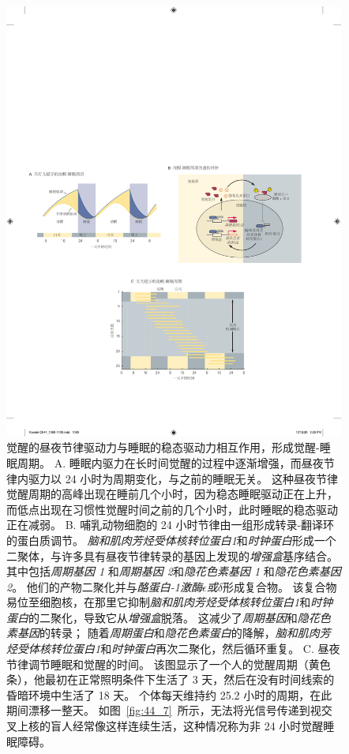 \begin{figure}[htbp]
	\centering
	\includegraphics[width=1.0\linewidth]{chap44/fig_44_6}
	\caption{觉醒的昼夜节律驱动力与睡眠的稳态驱动力相互作用，形成觉醒-睡眠周期。
		A. 睡眠内驱力在长时间觉醒的过程中逐渐增强，而昼夜节律内驱力以 24 小时为周期变化，与之前的睡眠无关。
		这种昼夜节律觉醒周期的高峰出现在睡前几个小时，因为稳态睡眠驱动正在上升，而低点出现在习惯性觉醒时间之前的几个小时，此时睡眠的稳态驱动正在减弱。
		B. 哺乳动物细胞的 24 小时节律由一组形成转录-翻译环的蛋白质调节。
		\textit{脑和肌肉芳烃受体核转位蛋白1}和\textit{时钟蛋白}形成一个二聚体，与许多具有昼夜节律转录的基因上发现的\textit{增强盒}基序结合。
		其中包括\textit{周期基因 1} 和\textit{周期基因 2}和\textit{隐花色素基因 1} 和\textit{隐花色素基因 2}。
		他们的产物二聚化并与\textit{酪蛋白-1激酶$\epsilon$或$\delta$}形成复合物。
		该复合物易位至细胞核，在那里它抑制\textit{脑和肌肉芳烃受体核转位蛋白1}和\textit{时钟蛋白}的二聚化，导致它从\textit{增强盒}脱落。
		这减少了\textit{周期基因}和\textit{隐花色素基因}的转录；
		随着\textit{周期蛋白}和\textit{隐花色素蛋白}的降解，\textit{脑和肌肉芳烃受体核转位蛋白1}和\textit{时钟蛋白}再次二聚化，然后循环重复。
		C. 昼夜节律调节睡眠和觉醒的时间。
		该图显示了一个人的觉醒周期（黄色条），他最初在正常照明条件下生活了 3 天，然后在没有时间线索的昏暗环境中生活了 18 天。
		个体每天维持约 25.2 小时的周期，在此期间漂移一整天。
		如图~\ref{fig:44_7}~所示，无法将光信号传递到视交叉上核的盲人经常像这样连续生活，这种情况称为非 24 小时觉醒睡眠障碍。}
	\label{fig:44_6}
\end{figure}


